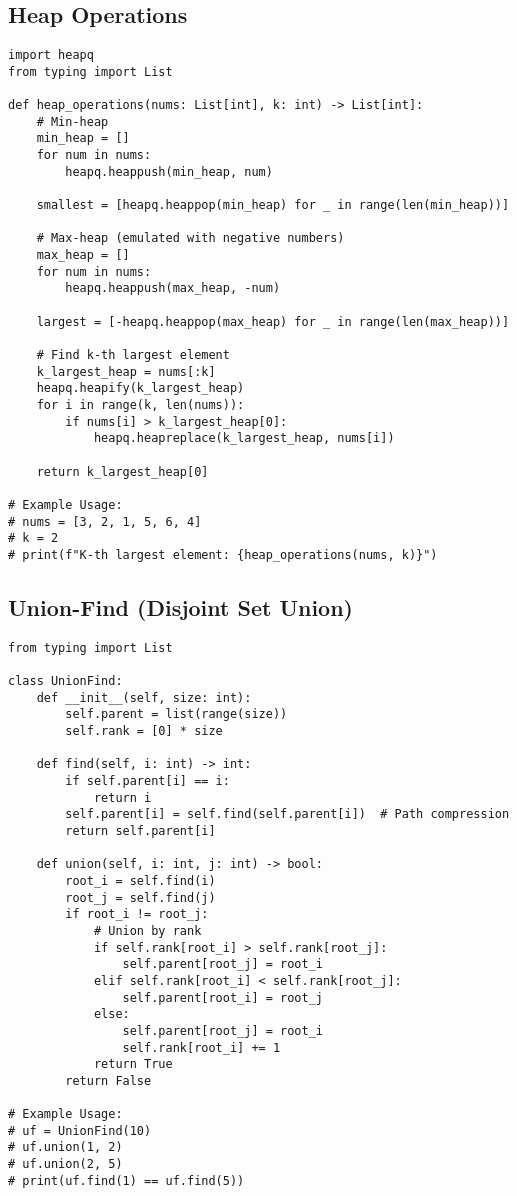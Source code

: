 \documentclass[11pt, a4paper]{article}
\begin{document}
\subsection{Heap Operations}
\begin{verbatim}
import heapq
from typing import List

def heap_operations(nums: List[int], k: int) -> List[int]:
    # Min-heap
    min_heap = []
    for num in nums:
        heapq.heappush(min_heap, num)
    
    smallest = [heapq.heappop(min_heap) for _ in range(len(min_heap))]
    
    # Max-heap (emulated with negative numbers)
    max_heap = []
    for num in nums:
        heapq.heappush(max_heap, -num)
        
    largest = [-heapq.heappop(max_heap) for _ in range(len(max_heap))]

    # Find k-th largest element
    k_largest_heap = nums[:k]
    heapq.heapify(k_largest_heap)
    for i in range(k, len(nums)):
        if nums[i] > k_largest_heap[0]:
            heapq.heapreplace(k_largest_heap, nums[i])
            
    return k_largest_heap[0]

# Example Usage:
# nums = [3, 2, 1, 5, 6, 4]
# k = 2
# print(f"K-th largest element: {heap_operations(nums, k)}")
\end{verbatim}

\subsection{Union-Find (Disjoint Set Union)}
\begin{verbatim}
from typing import List

class UnionFind:
    def __init__(self, size: int):
        self.parent = list(range(size))
        self.rank = [0] * size

    def find(self, i: int) -> int:
        if self.parent[i] == i:
            return i
        self.parent[i] = self.find(self.parent[i])  # Path compression
        return self.parent[i]

    def union(self, i: int, j: int) -> bool:
        root_i = self.find(i)
        root_j = self.find(j)
        if root_i != root_j:
            # Union by rank
            if self.rank[root_i] > self.rank[root_j]:
                self.parent[root_j] = root_i
            elif self.rank[root_i] < self.rank[root_j]:
                self.parent[root_i] = root_j
            else:
                self.parent[root_j] = root_i
                self.rank[root_i] += 1
            return True
        return False

# Example Usage:
# uf = UnionFind(10)
# uf.union(1, 2)
# uf.union(2, 5)
# print(uf.find(1) == uf.find(5))
\end{verbatim}
\end{document}
